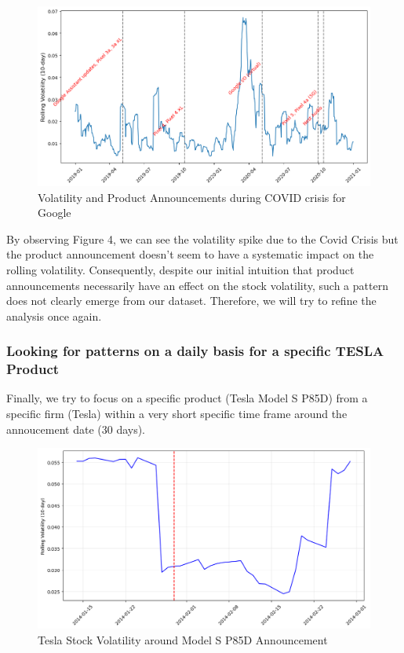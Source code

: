 \documentclass[12pt, oneside]{article}
\begin{document}
\begin{figure}[H]
    \centering
    \includegraphics[width=0.8\linewidth]{../images/GOOG_pattern.png}
    \caption{Volatility and Product Announcements during COVID crisis for Google}
    \label{fig:GOOG_pattern}
\end{figure}

By observing Figure 4, we can see the volatility spike due to the Covid Crisis but the product announcement doesn't seem to have a systematic impact on the rolling volatility. Consequently, despite our initial intuition that product announcements necessarily have an effect on the stock volatility, such a pattern does not clearly emerge from our dataset. Therefore, we will try to refine the analysis once again.

\subsubsection{Looking for patterns on a daily basis for a specific TESLA Product}
Finally, we try to focus on a specific product (Tesla Model S P85D) from a specific firm (Tesla) within a very short specific time frame around the annoucement date (30 days).

\begin{figure}[H]
    \centering
    \includegraphics[width=0.8\linewidth]{../images/TESLA_pattern.png}
    \caption{Tesla Stock Volatility around Model S P85D Announcement}
    \label{fig:TESLA_pattern}
\end{figure}
\end{document}
